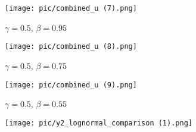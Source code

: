 \documentclass{article}
\begin{document}
\begin{figure}[H]
\centering
{\texttt{[image: pic/combined\_u (7).png]}}
\caption{$\gamma = 0.5$, $\beta = 0.95$}
\end{figure}

\begin{figure}[H]
\centering
{\texttt{[image: pic/combined\_u (8).png]}}
\caption{$\gamma = 0.5$, $\beta = 0.75$}
\end{figure}

\begin{figure}[H]
\centering
{\texttt{[image: pic/combined\_u (9).png]}}
\caption{$\gamma = 0.5$, $\beta = 0.55$}
\end{figure}

\newpage

\begin{figure}[H]
\centering
{\texttt{[image: pic/y2\_lognormal\_comparison (1).png]}}
\end{figure}






\end{document}
